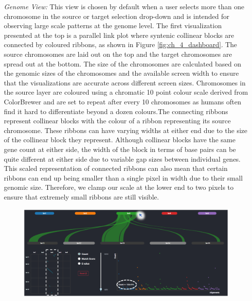 \textit{Genome View:}
This view is chosen by default when a user selects more than one chromosome in the source or target selection drop-down and is intended for observing large scale patterns at the genome level.
The first visualization presented at the top is a parallel link plot where syntenic collinear blocks are connected by coloured ribbons, as shown in Figure \ref{fig:ch_4_dashboard}. The source chromosomes are laid out on the top and the target chromosomes are spread out at the bottom. The size of the chromosomes are calculated based on the genomic sizes of the chromosomes and the available screen width to ensure that the visualizations are accurate across different screen sizes. Chromosomes in the source layer are coloured using a chromatic 10 point colour scale derived from ColorBrewer\cite{colorbrewer} and are set to repeat after every 10 chromosomes as humans often find it hard to differentiate beyond a dozen colours\cite{ware2012information}.The connecting ribbons represent collinear blocks with the colour of a ribbon representing its source chromosome. These ribbons can have varying widths at either end due to the size of the collinear block they represent. Although collinear blocks have the same gene count at either side, the width of the block in terms of base pairs can be quite different at either side due to variable gap sizes between individual genes. This scaled representation of connected ribbons can also mean that certain ribbons can end up being smaller than a single pixel in width due to their small genomic size. Therefore, we clamp our scale at the lower end to two pixels to ensure that extremely small ribbons are still visible.


\begin{figure}
  \centering
  \includegraphics[width=1\linewidth]{images/ch_5_genome_view_2.PNG}
  \label{fig:ch_5_genome_view_2}
\end{figure} 


